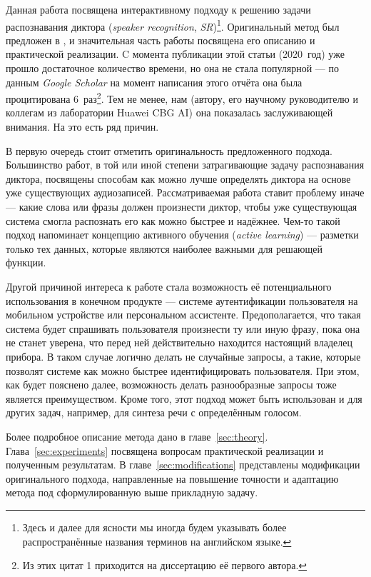 Данная работа посвящена интерактивному подходу к решению задачи распознавания
диктора (\textit{speaker recognition}, \textit{SR})\footnote{
    Здесь и далее для ясности мы иногда будем указывать более распространённые
    названия терминов на английском языке.
}. Оригинальный метод был предложен в \citeisr, и значительная часть
работы посвящена его описанию и практической реализации. C момента публикации
этой статьи (2020~год) уже прошло достаточное количество времени, но она не
стала популярной --- по данным \textit{Google Scholar} на момент написания
этого отчёта она была процитирована 6~раз\footnote{
    Из этих цитат 1 приходится на диссертацию её первого автора.
}.
Тем не менее, нам (автору, его научному руководителю и коллегам из лаборатории
Huawei CBG AI) она показалась заслуживающей внимания. На это есть ряд причин.

В первую очередь стоит отметить оригинальность предложенного подхода.
Большинство работ, в той или иной степени затрагивающие задачу распознавания
диктора, посвящены способам как можно лучше определять диктора на основе уже
существующих аудиозаписей. Рассматриваемая работа ставит проблему иначе ---
какие слова или фразы должен произнести диктор, чтобы уже существующая система
смогла распознать его как можно быстрее и надёжнее. Чем-то такой подход
напоминает концепцию активного обучения (\textit{active learning}) --- разметки
только тех данных, которые являются наиболее важными для решающей функции.

Другой причиной интереса к работе стала возможность её потенциального
использования в конечном продукте --- системе аутентификации пользователя на
мобильном устройстве или персональном ассистенте. Предополагается, что такая
система будет спрашивать пользователя произнести ту или иную фразу, пока она не
станет уверена, что перед ней действительно находится настоящий владелец
прибора. В таком случае логично делать не случайные запросы, а такие, которые
позволят системе как можно быстрее идентифицировать пользователя. При этом, как
будет пояснено далее, возможность делать разнообразные запросы тоже является
преимуществом. Кроме того, этот подход может быть использован и для других
задач, например, для синтеза речи с определённым голосом.

Более подробное описание метода дано в главе~\ref{sec:theory}.
Глава~\ref{sec:experiments} посвящена вопросам практической реализации и
полученным результатам. В главе~\ref{sec:modifications} представлены модификации
оригинального подхода, направленные на повышение точности и адаптацию метода под
сформулированную выше прикладную задачу.